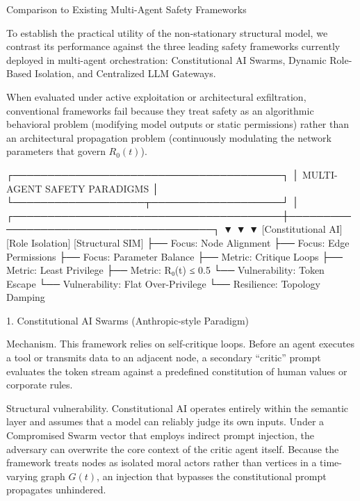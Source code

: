 Comparison to Existing Multi-Agent Safety Frameworks

To establish the practical utility of the non-stationary structural model, we contrast its performance against the three leading safety frameworks currently deployed in multi-agent orchestration: Constitutional AI Swarms, Dynamic Role-Based Isolation, and Centralized LLM Gateways.  

When evaluated under active exploitation or architectural exfiltration, conventional frameworks fail because they treat safety as an algorithmic behavioral problem (modifying model outputs or static permissions) rather than an architectural propagation problem (continuously modulating the network parameters that govern \(R_0(t)\)).

                             ┌───────────────────────────────────────┐
                             │       MULTI-AGENT SAFETY PARADIGMS    │
                             └───────────────────┬───────────────────┘
                                                 │
         ┌───────────────────────────────────────┼───────────────────────────────────────┐
         ▼                                       ▼                                       ▼
  [Constitutional AI]                     [Role Isolation]                       [Structural SIM]
 ├── Focus: Node Alignment               ├── Focus: Edge Permissions            ├── Focus: Parameter Balance
 ├── Metric: Critique Loops              ├── Metric: Least Privilege            ├── Metric: R₀(t) ≤ 0.5
 └── Vulnerability: Token Escape         └── Vulnerability: Flat Over-Privilege └── Resilience: Topology Damping

1. Constitutional AI Swarms (Anthropic-style Paradigm)

Mechanism.  
This framework relies on self-critique loops. Before an agent executes a tool or transmits data to an adjacent node, a secondary “critic” prompt evaluates the token stream against a predefined constitution of human values or corporate rules.

Structural vulnerability.  
Constitutional AI operates entirely within the semantic layer and assumes that a model can reliably judge its own inputs. Under a Compromised Swarm vector that employs indirect prompt injection, the adversary can overwrite the core context of the critic agent itself. Because the framework treats nodes as isolated moral actors rather than vertices in a time-varying graph \(G(t)\), an injection that bypasses the constitutional prompt propagates unhindered.  

